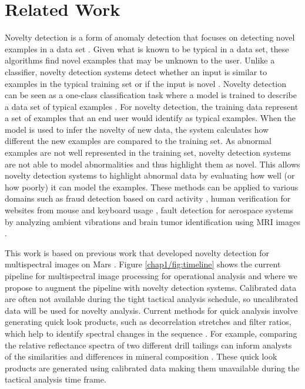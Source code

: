 \section{Related Work}
Novelty detection is a form of anomaly detection that focuses on detecting novel examples in a data set \cite{domingues2019comparative}. 
Given what is known to be typical in a data set, these algorithms find novel examples that may be unknown to the user.
Unlike a classifier, novelty detection systems detect whether an input is similar to examples in the typical training set or if the input is novel \cite{markou2003novelty}.
Novelty detection can be seen as a one-class classification task where a model is trained to describe a data set of typical examples \cite{pimentel2014review}. 
For novelty detection, the training data represent a set of examples that an end user would identify as typical examples. 
When the model is used to infer the novelty of new data, the system calculates how different the new examples are compared to the training set. 
As abnormal examples are not well represented in the training set, novelty detection systems are not able to model abnormalities and thus highlight them as novel. 
This allows novelty detection systems to highlight abnormal data by evaluating how well (or how poorly) it can model the examples. 
These methods can be applied to various domains such as fraud detection based on card activity \cite{oosterlinck2020one}, human verification for websites from mouse and keyboard usage \cite{kim2018keystroke}, fault detection for aerospace systems by analyzing ambient vibrations \cite{worden1997structural} and brain tumor identification using MRI images \cite{wang2020brain}.

This work is based on previous work that developed novelty detection for multispectral images on Mars \cite{kerner2020comparison}.
Figure \ref{chap1/fig:timeline} shows the current pipeline for multispectral image processing for operational analysis and where we propose to augment the pipeline with novelty detection systems. 
Calibrated data are often not available during the tight tactical analysis schedule, so uncalibrated data will be used for novelty analysis. 
Current methods for quick analysis involve generating quick look products, such as decorrelation stretches and filter ratios, which help to identify spectral changes in the sequence \cite{gillespie1986color}.
For example, comparing the relative reflectance spectra of two different drill tailings can inform analysts of the similarities and differences in mineral composition \cite{wellington2017visible}.
These quick look products are generated using calibrated data making them unavailable during the tactical analysis time frame.  

